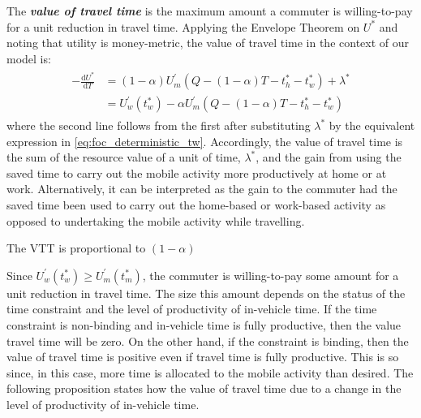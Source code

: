 \documentclass[12pt,a4paper,british]{article}
\begin{document}

The \textbf{\textit{value of travel time}} is the maximum amount a commuter is willing-to-pay for a unit reduction in travel time. Applying the Envelope Theorem on $U^{\ast}$ and noting that utility is money-metric, the value of travel time in the context of our model is:
\begin{align}
\begin{split}
-\frac{\mathrm{d}U^{\ast}}{\mathrm{d}T} & = \left(1 - \alpha\right) U_{m}^{\prime}\left( Q - \left(1 - \alpha\right) T - t_{h}^{\ast} - t_{w}^{\ast}\right) + \lambda^{\ast} \\
& = U_{w}^{\prime}\left( t_{w}^{*} \right) - \alpha U_{m}^{\prime}\left( Q - \left(1 - \alpha\right) T - t_{h}^{\ast} - t_{w}^{\ast} \right)
\end{split}
\label{eq:VOT_det}
\end{align}
where the second line follows from the first after substituting $\lambda^{\ast}$ by the equivalent expression in \eqref{eq:foc_deterministic_tw}. Accordingly, the value of travel time is the sum of the resource value of a unit of time, $\lambda^{\ast}$, and the gain from using the saved time to carry out the mobile activity more productively at home or at work. Alternatively, it can be interpreted as the gain to the commuter had the saved time been used to carry out the home-based or work-based activity as opposed to undertaking the mobile activity while travelling.

The VTT is proportional to $\left( 1 - \alpha \right)$

Since $U_{w}^{\prime}\left(t_{w}^{*}\right)\geq U_{m}^{\prime}\left(t_{m}^{\ast}\right)$, the commuter is willing-to-pay some amount for a unit reduction in travel time. The size this amount depends on the status of the time constraint and the level of productivity of in-vehicle time. If the time constraint is non-binding and in-vehicle time is fully productive, then the value travel time will be zero. On the other hand, if the constraint is binding, then the value of travel time is positive even if travel time is fully productive. This is so since, in this case, more time is allocated to the mobile activity than desired. The following proposition states how the value of travel time due to a change in the level of productivity of in-vehicle time. 
\end{document}
